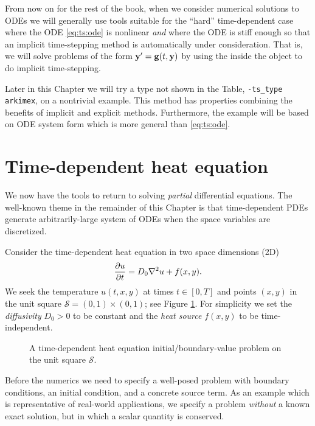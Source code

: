 From now on for the rest of the book, when we consider numerical solutions to ODEs we will generally use tools suitable for the ``hard'' time-dependent case where the ODE \eqref{eq:ts:ode} is nonlinear \emph{and} where the ODE is stiff enough so that an implicit time-stepping method is automatically under consideration.  That is, we will solve problems of the form $\mathbf{y}' = \mathbf{g}(t,\mathbf{y})$ by using the \pSNES inside the \pTS object to do implicit time-stepping.

Later in this Chapter we will try a type not shown in the Table, \texttt{-ts\_type arkimex}, on a nontrivial example.  This method has properties combining the benefits of implicit and explicit methods.  Furthermore, the example will be based on ODE system form which is more general than \eqref{eq:ts:ode}.


\section{Time-dependent heat equation}

We now have the tools to return to solving \emph{partial} differential equations.  The well-known theme in the remainder of this Chapter is that time-dependent PDEs generate arbitrarily-large system of ODEs when the space variables are discretized.

Consider the time-dependent heat equation in two space dimensions (2D)
\begin{equation}
\frac{\partial u}{\partial t} = D_0 \nabla^2 u + f(x,y). \label{eq:ts:heatequation}
\end{equation}
We seek the temperature $u(t,x,y)$ at times $t \in [0,T]$ and points $(x,y)$ in the unit square $\mathcal{S} =(0,1)\times (0,1)$; see Figure \ref{fig:ts:heatsquare}.  For simplicity we set the \emph{diffusivity} $D_0>0$ to be constant and the \emph{heat source} $f(x,y)$ to be time-independent.

\begin{figure}

\caption{A time-dependent heat equation initial/boundary-value problem on the unit square $\mathcal{S}$.}
\label{fig:ts:heatsquare}
\end{figure}

Before the numerics we need to specify a well-posed problem with boundary conditions, an initial condition, and a concrete source term.  As an example which is representative of real-world applications, we specify a problem \emph{without} a known exact solution, but in which a scalar quantity is conserved.

